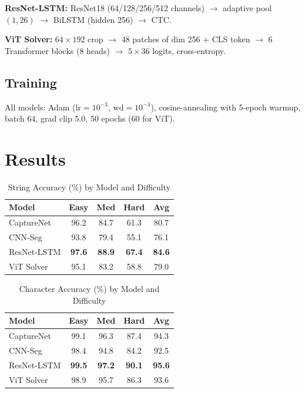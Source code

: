 ﻿\documentclass[conference]{IEEEtran}
\begin{document}
\textbf{ResNet-LSTM:} ResNet18 (64/128/256/512 channels) $\to$ adaptive pool $(1,26)$ $\to$ BiLSTM (hidden 256) $\to$ CTC.

\textbf{ViT Solver:} $64\times192$ crop $\to$ 48 patches of dim 256 + CLS token $\to$ 6 Transformer blocks (8 heads) $\to$ $5\times36$ logits, cross-entropy.

\subsection{Training}
All models: Adam ($\text{lr}=10^{-3}$, $\text{wd}=10^{-4}$), cosine-annealing with 5-epoch warmup, batch 64, grad clip 5.0, 50 epochs (60 for ViT).

\section{Results}

\begin{table}[htbp]
\caption{String Accuracy (\%) by Model and Difficulty}
\begin{center}
\begin{tabular}{|l|c|c|c|c|}
\hline
\textbf{Model} & \textbf{Easy} & \textbf{Med} & \textbf{Hard} & \textbf{Avg} \\
\hline
CaptureNet  & 96.2 & 84.7 & 61.3 & 80.7 \\
\hline
CNN-Seg     & 93.8 & 79.4 & 55.1 & 76.1 \\
\hline
ResNet-LSTM & \textbf{97.6} & \textbf{88.9} & \textbf{67.4} & \textbf{84.6} \\
\hline
ViT Solver  & 95.1 & 83.2 & 58.8 & 79.0 \\
\hline
\end{tabular}
\label{tab:str}
\end{center}
\end{table}

\begin{table}[htbp]
\caption{Character Accuracy (\%) by Model and Difficulty}
\begin{center}
\begin{tabular}{|l|c|c|c|c|}
\hline
\textbf{Model} & \textbf{Easy} & \textbf{Med} & \textbf{Hard} & \textbf{Avg} \\
\hline
CaptureNet  & 99.1 & 96.3 & 87.4 & 94.3 \\
\hline
CNN-Seg     & 98.4 & 94.8 & 84.2 & 92.5 \\
\hline
ResNet-LSTM & \textbf{99.5} & \textbf{97.2} & \textbf{90.1} & \textbf{95.6} \\
\hline
ViT Solver  & 98.9 & 95.7 & 86.3 & 93.6 \\
\hline
\end{tabular}
\label{tab:char}
\end{center}
\end{table}
\end{document}
